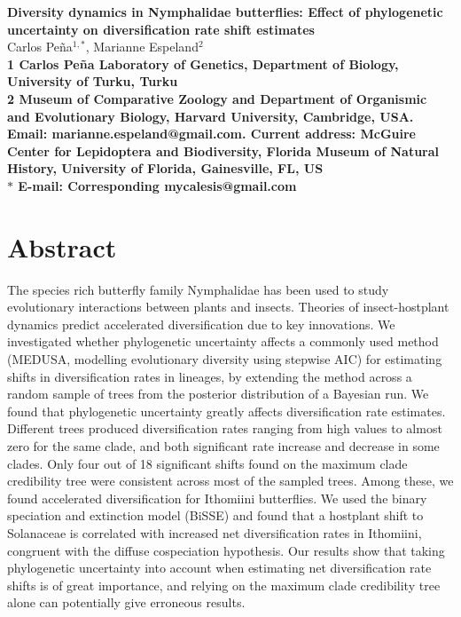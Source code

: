\documentclass[10pt]{article}
\author{}
\date{}
\begin{document}
\begin{flushleft}
{\Large
\textbf{Diversity dynamics in Nymphalidae butterflies: Effect of
phylogenetic uncertainty on diversification rate shift estimates}
}
\\
Carlos Pe\~na$^{1,\ast}$, 
Marianne Espeland$^{2}$
\\
\bf{1} Carlos Pe\~na Laboratory of Genetics, Department of Biology, University of Turku, Turku
\\
\bf{2} Museum of Comparative Zoology and Department of Organismic and
Evolutionary Biology, Harvard University, Cambridge, USA. Email:
marianne.espeland@gmail.com.
Current address: McGuire Center for Lepidoptera and Biodiversity,
Florida Museum of Natural History, University of Florida, Gainesville,
FL, US
\\
$\ast$ E-mail: Corresponding mycalesis@gmail.com
\end{flushleft}




\section*{Abstract}

The species rich butterfly family Nymphalidae has been used to study
evolutionary interactions between plants and insects. Theories of
insect-hostplant dynamics predict accelerated diversification due to key
innovations. We investigated whether phylogenetic uncertainty affects a
commonly used method (MEDUSA, modelling evolutionary diversity using
stepwise AIC) for estimating shifts in diversification rates in
lineages, by extending the method across a random sample of trees from
the posterior distribution of a Bayesian run. We found that phylogenetic
uncertainty greatly affects diversification rate estimates. Different
trees produced diversification rates ranging from high values to almost
zero for the same clade, and both significant rate increase and decrease
in some clades. Only four out of 18 significant shifts found on the
maximum clade credibility tree were consistent across most of the
sampled trees. Among these, we found accelerated diversification for
Ithomiini butterflies. We used the binary speciation and extinction
model (BiSSE) and found that a hostplant shift to Solanaceae is
correlated with increased net diversification rates in Ithomiini,
congruent with the diffuse cospeciation hypothesis. Our results show
that taking phylogenetic uncertainty into account when estimating net
diversification rate shifts is of great importance, and relying on the
maximum clade credibility tree alone can potentially give erroneous
results.
\end{document}
